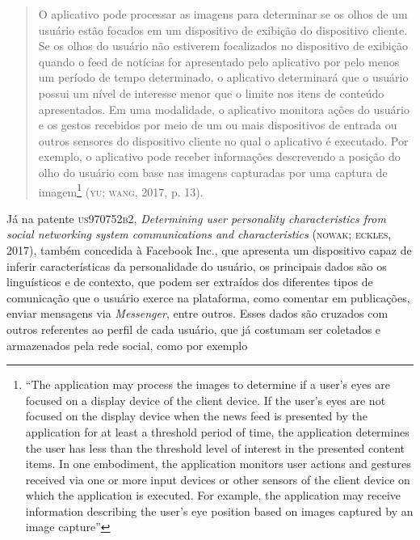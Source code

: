 \begin{quote}
O aplicativo pode processar as imagens para determinar se os olhos de um
usuário estão focados em um dispositivo de exibição do dispositivo
cliente. Se os olhos do usuário não estiverem focalizados no dispositivo
de exibição quando o feed de notícias for apresentado pelo aplicativo
por pelo menos um período de tempo determinado, o aplicativo determinará
que o usuário possui um nível de interesse menor que o limite nos itens
de conteúdo apresentados. Em uma modalidade, o aplicativo monitora ações
do usuário e os gestos recebidos por meio de um ou mais dispositivos de
entrada ou outros sensores do dispositivo cliente no qual o aplicativo é
executado. Por exemplo, o aplicativo pode receber informações
descrevendo a posição do olho do usuário com base nas imagens capturadas
por uma captura de imagem\footnote{``The application may process the
  images to determine if a user's eyes are focused on a display device
  of the client device. If the user's eyes are not focused on the
  display device when the news feed is presented by the application for
  at least a threshold period of time, the application determines the
  user has less than the threshold level of interest in the presented
  content items. In one embodiment, the application monitors user
  actions and gestures received via one or more input devices or other
  sensors of the client device on which the application is executed. For
  example, the application may receive information describing the user's
  eye position based on images captured by an image capture''} (\textsc{yu};
\textsc{wang}, 2017, p. 13).
\end{quote}

Já na patente \textsc{us970752b2}, \emph{Determining user personality
characteristics from social networking system communications and
characteristics} (\textsc{nowak}; \textsc{eckles}, 2017), também concedida à
Facebook Inc., que apresenta um dispositivo capaz de inferir
características da personalidade do usuário, os principais dados são os
linguísticos e de contexto, que podem ser extraídos dos diferentes tipos
de comunicação que o usuário exerce na plataforma, como comentar em
publicações, enviar mensagens via \emph{Messenger}, entre outros. Esses
dados são cruzados com outros referentes ao perfil de cada usuário, que
já costumam ser coletados e armazenados pela rede social, como por
exemplo

